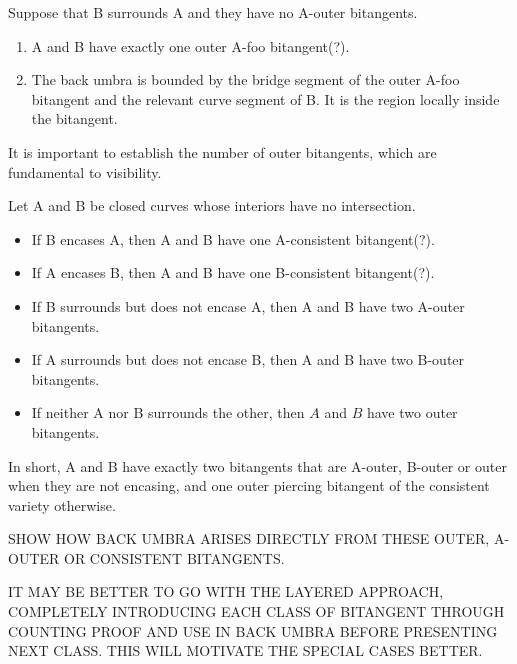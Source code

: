 \documentclass[12pt]{article}
\begin{document}
\vspace{.3in}

\begin{lemma}
Suppose that B surrounds A and they have no A-outer bitangents.
\begin{enumerate}
\item A and B have exactly one outer A-foo bitangent(?).
\item The back umbra is bounded by the bridge segment of the outer A-foo bitangent and 
      the relevant curve segment of B.
      It is the region locally inside the bitangent.
\end{enumerate}
\end{lemma}

\vspace{.3in}

\clearpage

It is important to establish the number of outer bitangents, 
which are fundamental to visibility.

\begin{lemma}
\label{lem:countOuter}
Let A and B be closed curves whose interiors have no intersection.
\begin{itemize}
\item If B encases A, 
      then A and B have one A-consistent bitangent(?).
\item If A encases B, 
      then A and B have one B-consistent bitangent(?).
\item If B surrounds but does not encase A, 
      then A and B have two A-outer bitangents. %
\item If A surrounds but does not encase B, 
      then A and B have two B-outer bitangents.
\item If neither A nor B surrounds the other, then $A$ and $B$ have two outer bitangents.
\end{itemize}
In short, A and B have exactly two bitangents that are A-outer, B-outer or outer
when they are not encasing, and one outer piercing bitangent of the consistent variety otherwise.
\end{lemma}

SHOW HOW BACK UMBRA ARISES DIRECTLY FROM THESE OUTER, A-OUTER OR CONSISTENT BITANGENTS.

IT MAY BE BETTER TO GO WITH THE LAYERED APPROACH, COMPLETELY 
INTRODUCING EACH CLASS OF BITANGENT THROUGH COUNTING PROOF AND USE IN BACK UMBRA 
BEFORE PRESENTING NEXT CLASS.
THIS WILL MOTIVATE THE SPECIAL CASES BETTER.
\end{document}
